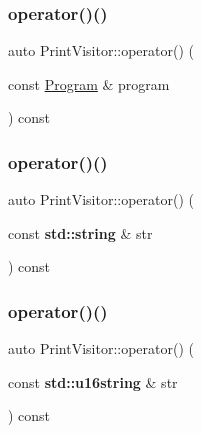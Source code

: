 \mbox{\label{struct_print_visitor_a8acc0e45686e3f9a4b8ed8e37175b89d}} 
\subsubsection{\texorpdfstring{operator()()}{operator()()}\hspace{0.1cm}{\footnotesize\ttfamily [33/38]}}
{\footnotesize\ttfamily auto Print\+Visitor\+::operator() (\begin{DoxyParamCaption}\item[{const \hyperlink{struct_program}{Program} \&}]{program }\end{DoxyParamCaption}) const\hspace{0.3cm}{\ttfamily [inline]}}

\mbox{\label{struct_print_visitor_ab4955e4e1389498d237c44ae863f9ba4}} 
\subsubsection{\texorpdfstring{operator()()}{operator()()}\hspace{0.1cm}{\footnotesize\ttfamily [34/38]}}
{\footnotesize\ttfamily auto Print\+Visitor\+::operator() (\begin{DoxyParamCaption}\item[{const \textbf{ std\+::string} \&}]{str }\end{DoxyParamCaption}) const\hspace{0.3cm}{\ttfamily [inline]}}

\mbox{\label{struct_print_visitor_aef6fd26e6d8681bd72e209a943b2a31f}} 
\subsubsection{\texorpdfstring{operator()()}{operator()()}\hspace{0.1cm}{\footnotesize\ttfamily [35/38]}}
{\footnotesize\ttfamily auto Print\+Visitor\+::operator() (\begin{DoxyParamCaption}\item[{const \textbf{ std\+::u16string} \&}]{str }\end{DoxyParamCaption}) const\hspace{0.3cm}{\ttfamily [inline]}}

